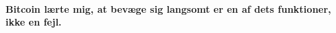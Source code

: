 \paragraph{Bitcoin lærte mig, at bevæge sig langsomt er en af dets 
funktioner, ikke en fejl.}

%
%
%
%
%
%
%
